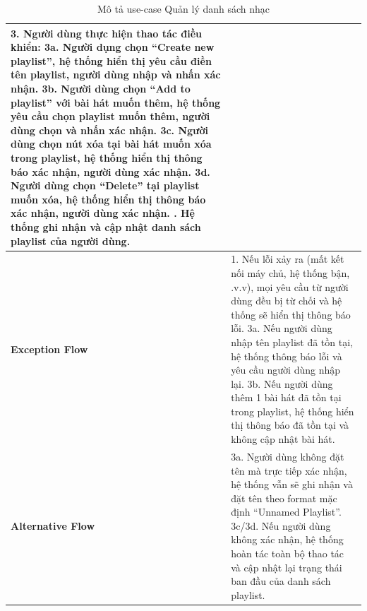 \documentclass[a4paper]{article}
\newcommand{\cach}{\hspace*{1.5em}\ignorespaces}
\begin{document}
\begin{table}[H]
\begin{tabularx}{\textwidth}{|l|X|}
		3. Người dùng thực hiện thao tác điều khiển: \newline
		\cach 3a. Người dụng chọn ``Create new playlist'', hệ thống hiển thị yêu cầu điền tên playlist, người dùng nhập và nhấn xác nhận. \newline
		\cach 3b. Người dùng chọn ``Add to playlist'' với bài hát muốn thêm, hệ thống yêu cầu chọn playlist muốn thêm, người dùng chọn và nhấn xác nhận. \newline
		\cach 3c. Người dùng chọn nút xóa tại bài hát muốn xóa trong playlist, hệ thống hiển thị thông báo xác nhận, người dùng xác nhận. \newline
		\cach 3d. Người dùng chọn ``Delete'' tại playlist muốn xóa, hệ thống hiển thị thông báo xác nhận, người dùng xác nhận. \newline
		4. Hệ thống ghi nhận và cập nhật danh sách playlist của người dùng.                                                                                                                                         \\ \hline
		\textbf{Exception Flow}
		                       & 1. Nếu lỗi xảy ra (mất kết nối máy chủ, hệ thống bận, .v.v), mọi yêu cầu từ người dùng đều bị từ chối và hệ thống sẽ hiển thị thông báo lỗi. \newline
		3a. Nếu người dùng nhập tên playlist đã tồn tại, hệ thống thông báo lỗi và yêu cầu người dùng nhập lại. \newline
		3b. Nếu người dùng thêm 1 bài hát đã tồn tại trong playlist, hệ thống hiển thị thông báo đã tồn tại và không cập nhật bài hát.                                                                              \\ \hline
		\textbf{Alternative Flow}
		                       & 3a. Người dùng không đặt tên mà trực tiếp xác nhận, hệ thống vẫn sẽ ghi nhận và đặt tên theo format mặc định ``Unnamed Playlist''.\newline
		3c/3d. Nếu người dùng không xác nhận, hệ thống hoàn tác toàn bộ thao tác và cập nhật lại trạng thái ban đầu của danh sách playlist.                                                                         \\ \hline
	\end{tabularx}
	\caption{Mô tả use-case Quản lý danh sách nhạc}
\end{table}

\end{document}
